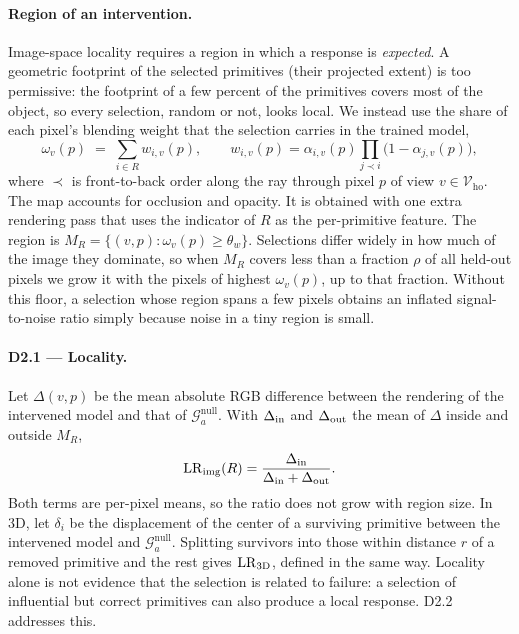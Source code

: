 \paragraph{Region of an intervention.}
Image-space locality requires a region in which a response is \emph{expected}. A geometric footprint
of the selected primitives (their projected extent) is too permissive: the footprint of a few percent of
the primitives covers most of the object, so every selection, random or not, looks local. We instead use
the share of each pixel's blending weight that the selection carries in the trained model,
\begin{equation}
  \omega_v(p) \;=\; \sum_{i\in R} w_{i,v}(p), \qquad
  w_{i,v}(p) = \alpha_{i,v}(p)\prod_{j\prec i}\bigl(1-\alpha_{j,v}(p)\bigr),
\end{equation}
where $\prec$ is front-to-back order along the ray through pixel $p$ of view $v\in\mathcal{V}_{\mathrm{ho}}$.
The map accounts for occlusion and opacity. It is obtained with one extra rendering pass that uses
the indicator of $R$ as the per-primitive feature. The region is
$M_R=\{(v,p):\omega_v(p)\ge\theta_w\}$. Selections differ widely in how much of the image they
dominate, so when $M_R$ covers less than a fraction $\rho$ of all held-out pixels we grow it with the
pixels of highest $\omega_v(p)$, up to that fraction. Without this floor, a selection whose region spans
a few pixels obtains an inflated signal-to-noise ratio simply because noise in a tiny region is small.

\paragraph{D2.1 — Locality.}
Let $\Delta(v,p)$ be the mean absolute RGB difference between the rendering of the intervened model and
that of $\mathcal{G}^{\mathrm{null}}_a$. With $\Delta_{\mathrm{in}}$ and $\Delta_{\mathrm{out}}$ the mean of $\Delta$ inside and outside
$M_R$,
\begin{equation}
  \mathrm{LR}_{\mathrm{img}}(R) = \frac{\Delta_{\mathrm{in}}}{\Delta_{\mathrm{in}}+\Delta_{\mathrm{out}}}.
\end{equation}
Both terms are per-pixel means, so the ratio does not grow with region size. In 3D, let $\delta_i$ be
the displacement of the center of a surviving primitive between the intervened model and
$\mathcal{G}^{\mathrm{null}}_a$. Splitting survivors into those within distance $r$ of a removed
primitive and the rest gives $\mathrm{LR}_{\mathrm{3D}}$, defined in the same way. Locality alone is not
evidence that the selection is related to failure: a selection of influential but correct primitives can
also produce a local response. D2.2 addresses this.

